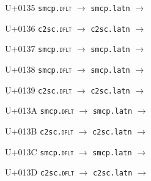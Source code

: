 \documentclass{article}
\begin{document}
\begin{substitutions}
\goodbreak

U+0135  \linebreak
    \texttt{smcp.\textsc{dflt}} $\to$  \linebreak
    \texttt{smcp.latn} $\to$  

\goodbreak

U+0136  \linebreak
    \texttt{c2sc.\textsc{dflt}} $\to$  \linebreak
    \texttt{c2sc.latn} $\to$  

\goodbreak

U+0137  \linebreak
    \texttt{smcp.\textsc{dflt}} $\to$  \linebreak
    \texttt{smcp.latn} $\to$  

\goodbreak

U+0138  \linebreak
    \texttt{smcp.\textsc{dflt}} $\to$  \linebreak
    \texttt{smcp.latn} $\to$  

\goodbreak

U+0139  \linebreak
    \texttt{c2sc.\textsc{dflt}} $\to$  \linebreak
    \texttt{c2sc.latn} $\to$  

\goodbreak

U+013A  \linebreak
    \texttt{smcp.\textsc{dflt}} $\to$  \linebreak
    \texttt{smcp.latn} $\to$  

\goodbreak

U+013B  \linebreak
    \texttt{c2sc.\textsc{dflt}} $\to$  \linebreak
    \texttt{c2sc.latn} $\to$  

\goodbreak

U+013C  \linebreak
    \texttt{smcp.\textsc{dflt}} $\to$  \linebreak
    \texttt{smcp.latn} $\to$  

\goodbreak

U+013D  \linebreak
    \texttt{c2sc.\textsc{dflt}} $\to$  \linebreak
    \texttt{c2sc.latn} $\to$  


\end{substitutions}
\end{document}
